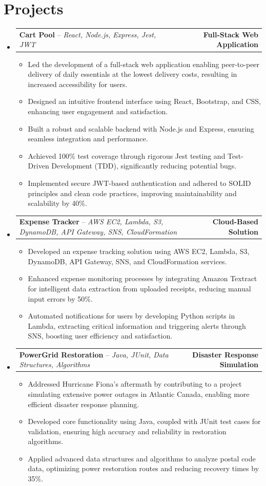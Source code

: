\documentclass[letterpaper,11pt]{article}
\makeatletter
\newcommand{\resumeItem}[1]{
  \item\small{
    {#1 \vspace{-2pt}}
  }
}
\newcommand{\resumeProjectHeading}[2]{
    \item
    \begin{tabular*}{1.001\textwidth}{l@{\extracolsep{\fill}}r}
      \small#1 & \textbf{\small #2}\\
    \end{tabular*}\vspace{-7pt}
}
\newcommand{\resumeSubHeadingListStart}{\begin{itemize}[leftmargin=0.0in, label={}]}
\newcommand{\resumeSubHeadingListEnd}{\end{itemize}}
\newcommand{\resumeItemListStart}{\begin{itemize}}
\newcommand{\resumeItemListEnd}{\end{itemize}\vspace{-5pt}}
\makeatother
\begin{document}
\section{Projects}
    \vspace{-5pt}
    \resumeSubHeadingListStart
    
      \resumeProjectHeading
          {\textbf{Cart Pool} -- \emph{React, Node.js, Express, Jest, JWT}}{Full-Stack Web Application}
          \resumeItemListStart
            \resumeItem{Led the development of a full-stack web application enabling peer-to-peer delivery of daily essentials at the lowest delivery costs, resulting in increased accessibility for users.}
            \resumeItem{Designed an intuitive frontend interface using React, Bootstrap, and CSS, enhancing user engagement and satisfaction.}
            \resumeItem{Built a robust and scalable backend with Node.js and Express, ensuring seamless integration and performance.}
            \resumeItem{Achieved 100\% test coverage through rigorous Jest testing and Test-Driven Development (TDD), significantly reducing potential bugs.}
            \resumeItem{Implemented secure JWT-based authentication and adhered to SOLID principles and clean code practices, improving maintainability and scalability by 40\%.}
          \resumeItemListEnd
          \vspace{-13pt}
          
      \resumeProjectHeading
          {\textbf{Expense Tracker} -- \emph{AWS EC2, Lambda, S3, DynamoDB, API Gateway, SNS, CloudFormation}}{Cloud-Based Solution}
          \resumeItemListStart
            \resumeItem{Developed an expense tracking solution using AWS EC2, Lambda, S3, DynamoDB, API Gateway, SNS, and CloudFormation services.}
            \resumeItem{Enhanced expense monitoring processes by integrating Amazon Textract for intelligent data extraction from uploaded receipts, reducing manual input errors by 50\%.}
            \resumeItem{Automated notifications for users by developing Python scripts in Lambda, extracting critical information and triggering alerts through SNS, boosting user efficiency and satisfaction.}
          \resumeItemListEnd
          \vspace{-13pt}
          
      \resumeProjectHeading
          {\textbf{PowerGrid Restoration} -- \emph{Java, JUnit, Data Structures, Algorithms}}{Disaster Response Simulation}
          \resumeItemListStart
            \resumeItem{Addressed Hurricane Fiona's aftermath by contributing to a project simulating extensive power outages in Atlantic Canada, enabling more efficient disaster response planning.}
            \resumeItem{Developed core functionality using Java, coupled with JUnit test cases for validation, ensuring high accuracy and reliability in restoration algorithms.}
            \resumeItem{Applied advanced data structures and algorithms to analyze postal code data, optimizing power restoration routes and reducing recovery times by 35\%.}
          \resumeItemListEnd
          
    \resumeSubHeadingListEnd
\vspace{-15pt}
\end{document}
